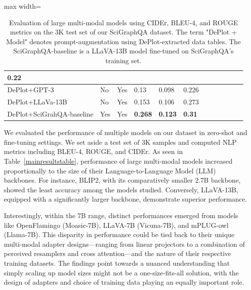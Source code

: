 \documentclass{article}
\begin{document}
\begin{table}[!htbp]
\begin{adjustbox}{max width=\textwidth}
\begin{tabular}{p{4.13cm}p{2.48cm}p{2.48cm}p{2.48cm}p{2.48cm}p{2.48cm}p{4.13cm}p{2.48cm}p{2.48cm}p{2.48cm}p{2.48cm}p{2.48cm}}
\multicolumn{1}{|p{2.48cm}|}{0.22} \\ 
\hline
\multicolumn{1}{|p{4.13cm}}{DePlot+GPT-3} & 
\multicolumn{1}{|p{2.48cm}}{No} & 
\multicolumn{1}{|p{2.48cm}}{Yes} & 
\multicolumn{1}{|p{2.48cm}}{0.13} & 
\multicolumn{1}{|p{2.48cm}}{0.098} & 
\multicolumn{1}{|p{2.48cm}|}{0.226} \\ 
\hline
\multicolumn{1}{|p{4.13cm}}{DePlot+LLaVa-13B} & 
\multicolumn{1}{|p{2.48cm}}{No} & 
\multicolumn{1}{|p{2.48cm}}{Yes} & 
\multicolumn{1}{|p{2.48cm}}{0.153} & 
\multicolumn{1}{|p{2.48cm}}{0.106} & 
\multicolumn{1}{|p{2.48cm}|}{0.273} \\ 
\hline
\multicolumn{1}{|p{4.13cm}}{DePlot+SciGrahQA-baseline} & 
\multicolumn{1}{|p{2.48cm}}{Yes} & 
\multicolumn{1}{|p{2.48cm}}{Yes} & 
\multicolumn{1}{|p{2.48cm}}{\textbf{0.268}} & 
\multicolumn{1}{|p{2.48cm}}{\textbf{0.123}} & 
\multicolumn{1}{|p{2.48cm}|}{\textbf{0.31}} \\ 
\hline
\end{tabular}
\end{adjustbox}
\caption{Evaluation of large multi-modal models using CIDEr, BLEU-4, and ROUGE metrics on the 3K test set of our SciGraphQA dataset. The term "DePlot + {Model}" denotes prompt-augmentation using DePlot-extracted data tables. The SciGraphQA-baseline is a LLaVA-13B model fine-tuned on SciGraphQA's  training set.}
\label{tab:evaluation_large_multimodal_models_performance}\end{table}
We evaluated the performance of multiple models on our dataset in zero-shot and fine-tuning settings. We set aside a test set of 3K samples and computed NLP metrics including BLEU-4, ROUGE, and CIDEr. As seen in Table~\ref{mainresultstable}, performance of large multi-modal models increased proportionally to the size of their Language-to-Language Model (LLM) backbones. For instance, BLIP2, with its comparatively smaller 2.7B backbone, showed the least accuracy among the models studied. Conversely, LLaVA-13B, equipped with a significantly larger backbone, demonstrate superior performance.

Interestingly, within the 7B range, distinct performances emerged from models like OpenFlamingo (Moasic-7B), LLaVA-7B (Vicuna-7B), and mPLUG-owl (Llama-7B). This disparity in performance could be tied back to their unique multi-modal adapter designs—ranging from linear projectors to a combination of perceived resamplers and cross attention—and the nature of their respective training datasets. The findings point towards a nuanced understanding that simply scaling up model sizes might not be a one-size-fits-all solution, with the design of adapters and choice of training data playing an equally important role.
\end{document}
